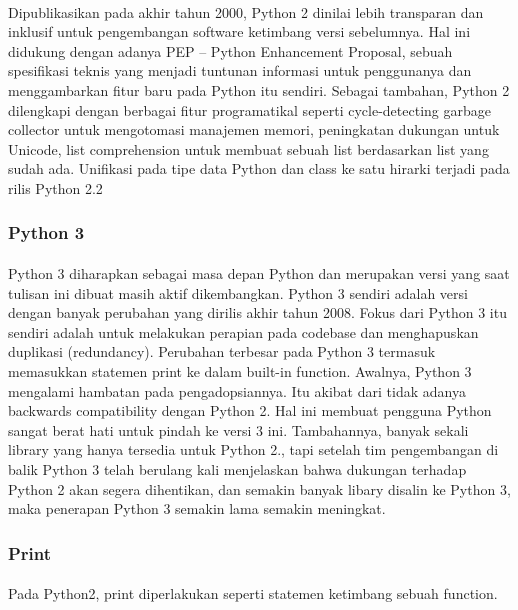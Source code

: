 \documentclass{article}
\begin{document}
\paragraph{}
Dipublikasikan pada akhir tahun 2000, Python 2 dinilai lebih transparan dan inklusif untuk pengembangan software ketimbang versi sebelumnya. Hal ini didukung dengan adanya PEP – Python Enhancement Proposal, sebuah spesifikasi teknis yang menjadi tuntunan informasi untuk penggunanya dan menggambarkan fitur baru pada Python itu sendiri. Sebagai tambahan, Python 2 dilengkapi dengan berbagai fitur programatikal seperti cycle-detecting garbage collector untuk mengotomasi manajemen memori, peningkatan dukungan untuk Unicode, list comprehension untuk membuat sebuah list berdasarkan list yang sudah ada. Unifikasi pada tipe data Python dan class ke satu hirarki terjadi pada rilis Python 2.2
\subsubsection{Python 3}
\paragraph{}
Python 3 diharapkan sebagai masa depan Python dan merupakan versi yang saat tulisan ini dibuat masih aktif dikembangkan. Python 3 sendiri adalah versi dengan banyak perubahan yang dirilis akhir tahun 2008. Fokus dari Python 3 itu sendiri adalah untuk melakukan perapian pada codebase dan menghapuskan duplikasi (redundancy). Perubahan terbesar pada Python 3 termasuk memasukkan statemen print ke dalam built-in function. Awalnya, Python 3 mengalami hambatan pada pengadopsiannya. Itu akibat dari tidak adanya backwards compatibility dengan Python 2. Hal ini membuat pengguna Python sangat berat hati untuk pindah ke versi 3 ini. Tambahannya, banyak sekali library yang hanya tersedia untuk Python 2., tapi setelah tim pengembangan di balik Python 3 telah berulang kali menjelaskan bahwa dukungan terhadap Python 2 akan segera dihentikan, dan semakin banyak libary disalin ke Python 3, maka penerapan Python 3 semakin lama semakin meningkat.
\subsubsection{Print}
\paragraph{}
Pada Python2, print diperlakukan seperti statemen ketimbang sebuah function.
\end{document}
